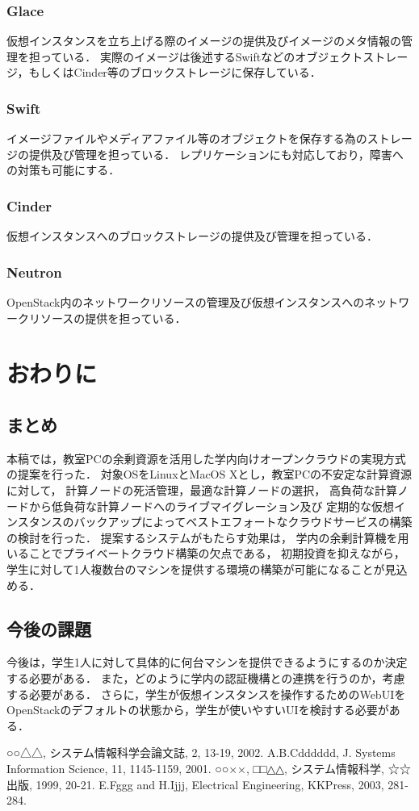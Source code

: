 \documentclass[11pt,a4paper]{jsarticle}
\begin{document}
\subsubsection{Glace}
仮想インスタンスを立ち上げる際のイメージの提供及びイメージのメタ情報の管理を担っている．
実際のイメージは後述するSwiftなどのオブジェクトストレージ，もしくはCinder等のブロックストレージに保存している．
\subsubsection{Swift}
イメージファイルやメディアファイル等のオブジェクトを保存する為のストレージの提供及び管理を担っている．
レプリケーションにも対応しており，障害への対策も可能にする．
\subsubsection{Cinder}
仮想インスタンスへのブロックストレージの提供及び管理を担っている．
\subsubsection{Neutron}
OpenStack内のネットワークリソースの管理及び仮想インスタンスへのネットワークリソースの提供を担っている．

\section{おわりに}
\subsection{まとめ}
本稿では，教室PCの余剰資源を活用した学内向けオープンクラウドの実現方式の提案を行った．
対象OSをLinuxとMacOS Xとし，教室PCの不安定な計算資源に対して，
計算ノードの死活管理，最適な計算ノードの選択，
高負荷な計算ノードから低負荷な計算ノードへのライブマイグレーション及び
定期的な仮想インスタンスのバックアップによってベストエフォートなクラウドサービスの構築の検討を行った．
提案するシステムがもたらす効果は，
学内の余剰計算機を用いることでプライベートクラウド構築の欠点である，
初期投資を抑えながら，学生に対して1人複数台のマシンを提供する環境の構築が可能になることが見込める．
\subsection{今後の課題}
今後は，学生1人に対して具体的に何台マシンを提供できるようにするのか決定する必要がある．
また，どのように学内の認証機構との連携を行うのか，考慮する必要がある．
さらに，学生が仮想インスタンスを操作するためのWebUIをOpenStackのデフォルトの状態から，学生が使いやすいUIを検討する必要がある．

\begin{thebibliography}{99}
	○○△△, システム情報科学会論文誌, 2, 13-19, 2002.
	A.B.Cdddddd, J. Systems Information Science, 11, 1145-1159, 2001.
	○○××, □□△△, システム情報科学, ☆☆出版, 1999, 20-21.
	E.Fggg and H.Ijjj, Electrical Engineering, KKPress, 2003, 281-284.
\end{thebibliography}
\end{document}
